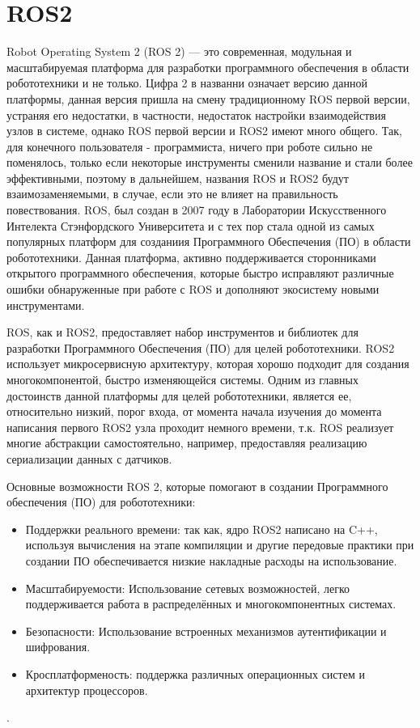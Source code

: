 \documentclass[a4paper, 14pt]{extreport}
\begin{document}
\section{ROS2}
\par\noindent ​Robot Operating System 2 (ROS 2)\cite{rosMain}\cite{rosPrep} — это современная, модульная и масштабируемая платформа для разработки программного
 обеспечения в области робототехники и не только. Цифра 2 в названни означает версию данной платформы, данная версия пришла на смену
 традиционному ROS первой версии, устраняя его недостатки, в частности, недостаток настройки взаимодействия узлов в системе, однако
 ROS первой версии и ROS2 имеют много общего. Так, для конечного пользователя - программиста, ничего при роботе сильно не поменялось,
 только если некоторые инструменты сменили название и стали более эффективными, поэтому в дальнейшем, названия ROS и ROS2 будут 
 взаимозаменяемыми, в случае, если это не влияет на правильность повествования.
 ROS, был создан в 2007 году в Лаборатории Искусственного Интелекта Стэнфордского Университета и с тех пор стала одной из
 самых популярных платформ для созданиия Программного Обеспечения (ПО) в области робототехники. Данная платформа, активно
 поддерживается сторонниками открытого программного обеспечения, которые быстро исправляют различные ошибки обнаруженные 
 при работе с ROS и дополняют экосистему новыми инструментами. 
\par\noindent ROS, как и ROS2, предоставляет набор инструментов и библиотек для разработки Программного Обеспечения (ПО) для 
 целей робототехники. ROS2 использует микросервисную архитектуру, которая хорошо подходит для создания многокомпонентой,
 быстро изменяющейся системы. Одним из главных достоинств данной платформы для целей робототехники, является ее, относительно
 низкий, порог входа, от момента начала изучения до момента написания первого ROS2 узла проходит немного времени, т.к. ROS
 реализует многие абстракции самостоятельно, например, предоставляя реализацию сериализации данных с датчиков.
\par\noindent Основные возможности ROS 2, которые помогают в создании Программного обеспечения (ПО) для робототехники:​
\begin{itemize}
        \item Поддержки реального времени: так как, ядро ROS2 написано на C++, используя вычисления на этапе компиляции и 
         другие передовые практики при создании ПО обеспечивается низкие накладные расходы на использование.
        \item Масштабируемости: Использование сетевых возможностей, легко поддерживается работа в распределённых и многокомпонентных системах.
        \item Безопасности: Использование встроенных механизмов аутентификации и шифрования.
        \item Кросплатформеность: поддержка различных операционных систем и архитектур процессоров.
\end{itemize}.
\end{document}

